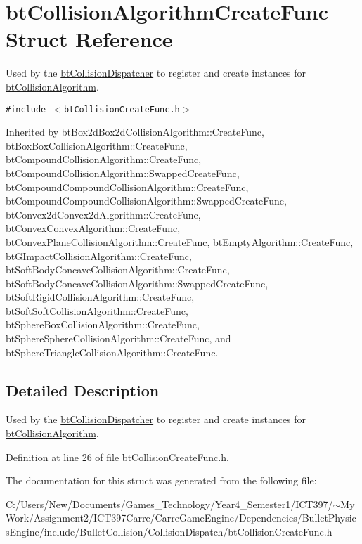 \hypertarget{structbt_collision_algorithm_create_func}{
\section{btCollisionAlgorithmCreateFunc Struct Reference}
\label{structbt_collision_algorithm_create_func}
}
Used by the \hyperlink{classbt_collision_dispatcher}{btCollisionDispatcher} to register and create instances for \hyperlink{classbt_collision_algorithm}{btCollisionAlgorithm}.  


{\tt \#include $<$btCollisionCreateFunc.h$>$}

Inherited by btBox2dBox2dCollisionAlgorithm::CreateFunc, btBoxBoxCollisionAlgorithm::CreateFunc, btCompoundCollisionAlgorithm::CreateFunc, btCompoundCollisionAlgorithm::SwappedCreateFunc, btCompoundCompoundCollisionAlgorithm::CreateFunc, btCompoundCompoundCollisionAlgorithm::SwappedCreateFunc, btConvex2dConvex2dAlgorithm::CreateFunc, btConvexConvexAlgorithm::CreateFunc, btConvexPlaneCollisionAlgorithm::CreateFunc, btEmptyAlgorithm::CreateFunc, btGImpactCollisionAlgorithm::CreateFunc, btSoftBodyConcaveCollisionAlgorithm::CreateFunc, btSoftBodyConcaveCollisionAlgorithm::SwappedCreateFunc, btSoftRigidCollisionAlgorithm::CreateFunc, btSoftSoftCollisionAlgorithm::CreateFunc, btSphereBoxCollisionAlgorithm::CreateFunc, btSphereSphereCollisionAlgorithm::CreateFunc, and btSphereTriangleCollisionAlgorithm::CreateFunc.



\subsection{Detailed Description}
Used by the \hyperlink{classbt_collision_dispatcher}{btCollisionDispatcher} to register and create instances for \hyperlink{classbt_collision_algorithm}{btCollisionAlgorithm}. 

Definition at line 26 of file btCollisionCreateFunc.h.

The documentation for this struct was generated from the following file:\begin{CompactItemize}
\item 
C:/Users/New/Documents/Games\_\-Technology/Year4\_\-Semester1/ICT397/$\sim$My Work/Assignment2/ICT397Carre/CarreGameEngine/Dependencies/BulletPhysicsEngine/include/BulletCollision/CollisionDispatch/btCollisionCreateFunc.h\end{CompactItemize}

